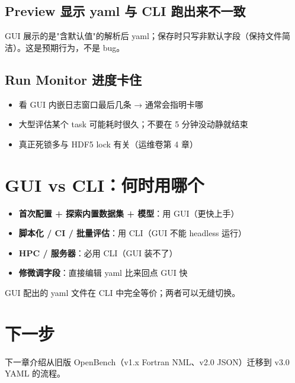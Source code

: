 \subsection{Preview 显示 yaml 与 CLI 跑出来不一致}

GUI 展示的是"含默认值"的解析后 yaml；保存时只写非默认字段（保持文件简洁）。这是预期行为，不是 bug。

\subsection{Run Monitor 进度卡住}

\begin{itemize}
  \item 看 GUI 内嵌日志窗口最后几条 → 通常会指明卡哪
  \item 大型评估某个 task 可能耗时很久；不要在 5 分钟没动静就结束
  \item 真正死锁多与 HDF5 lock 有关（运维卷第 4 章）
\end{itemize}

\section{GUI vs CLI：何时用哪个}

\begin{itemize}
  \item \textbf{首次配置 + 探索内置数据集 + 模型}：用 GUI（更快上手）
  \item \textbf{脚本化 / CI / 批量评估}：用 CLI（GUI 不能 headless 运行）
  \item \textbf{HPC / 服务器}：必用 CLI（GUI 装不了）
  \item \textbf{修微调字段}：直接编辑 yaml 比来回点 GUI 快
\end{itemize}

GUI 配出的 yaml 文件在 CLI 中完全等价；两者可以无缝切换。

\section{下一步}

下一章介绍从旧版 OpenBench（v1.x Fortran NML、v2.0 JSON）迁移到 v3.0 YAML 的流程。
